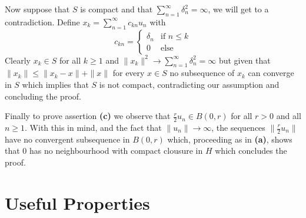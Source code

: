 \documentclass{article}
\begin{document}
\begin{exercise}
\bigbreak

Now suppose that $S$ is compact and that $\sum_{n=1}^{\infty} \delta_n^2 = \infty $, we will get to a contradiction. Define $x_k = \sum_{n=1}^{\infty} c_{kn}u_n $ with
\[
    c_{kn} = 
    \begin{cases}
        \delta_n & \text{if } n \le k \\
        0 & \text{else}
    \end{cases}
\]
Clearly $x_k \in S$ for all $k \ge 1$  and $\|x_k\|^2 \rightarrow \sum_{n=1}^{\infty} \delta_n^2 = \infty$ but given that $\|x_k\| \le \|x_k-x\| + \|x\|$ for every $x \in S$ no subsequence of $x_k$ can converge in $S$ which implies that $S$ is not compact, contradicting our assumption and concluding the proof.  

\bigbreak

Finally to prove assertion \textbf{(c)} we observe that $\frac{r}{2}u_n \in B \left( 0,r \right)$ for all $r > 0$ and all $n \ge 1$. With this in mind, and the fact that $\|u_n\| \rightarrow \infty $, the sequences $\|\frac{r}{2}u_n\| $ have no convergent subsequence in $B \left( 0,r \right) $ which, proceeding as in \textbf{(a)}, shows that $0$ has no neighbourhood with compact clousure in $H$ which concludes the proof. 
\end{exercise}

\section*{Useful Properties}
\end{document}
